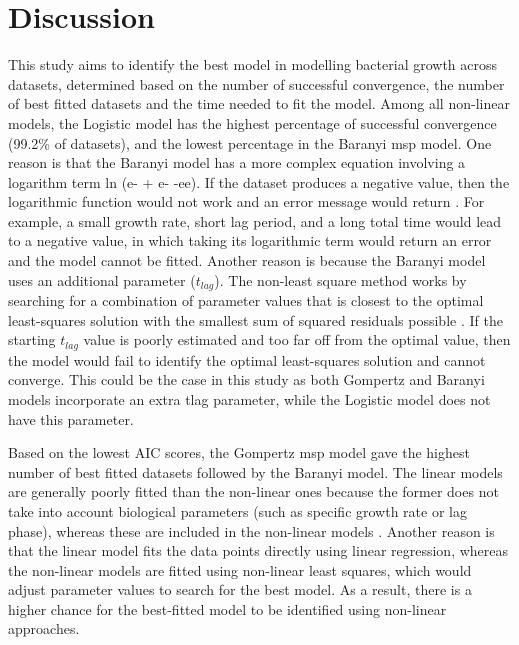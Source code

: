 \documentclass[11pt]{article}
\begin{document}
\section{Discussion}
This study aims to identify the best model in modelling bacterial growth across datasets, determined based on the number of successful convergence, the number of best fitted datasets and the time needed to fit the model. Among all non-linear models, the Logistic model has the highest percentage of successful convergence (99.2\% of datasets), and the lowest percentage in the Baranyi msp model. One reason is that the Baranyi model has a more complex equation involving a logarithm term ln (e- + e- -ee). If the dataset produces a negative value, then the logarithmic function would not work and an error message would return \cite{wiscombe_exponential-sum_1977}. For example, a small growth rate, short lag period, and a long total time would lead to a negative value, in which taking its logarithmic term would return an error and the model cannot be fitted. Another reason is because the Baranyi model uses an additional parameter (\(t_{lag}\)). The non-least square method works by searching for a combination of parameter values that is closest to the optimal least-squares solution with the smallest sum of squared residuals possible \cite{see_parameter_2018}. If the starting \(t_{lag}\) value is poorly estimated and too far off from the optimal value, then the model would fail to identify the optimal least-squares solution and cannot converge. This could be the case in this study as both Gompertz and Baranyi models incorporate an extra tlag parameter, while the Logistic model does not have this parameter.  
\vspace{\baselineskip}

Based on the lowest AIC scores, the Gompertz msp model gave the highest number of best fitted datasets followed by the Baranyi model. The linear models are generally poorly fitted than the non-linear ones because the former does not take into account biological parameters (such as specific growth rate or lag phase), whereas these are included in the non-linear models \cite{peleg_microbial_2011}. Another reason is that the linear model fits the data points directly using linear regression, whereas the non-linear models are fitted using non-linear least squares, which would adjust parameter values to search for the best model. As a result, there is a higher chance for the best-fitted model to be identified using non-linear approaches. 
\vspace{\baselineskip}
\end{document}
